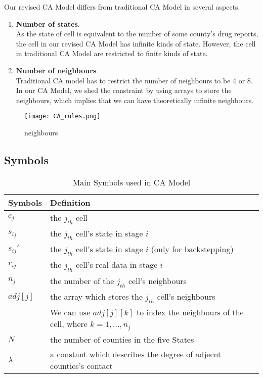 \documentclass{mcmthesis}
\begin{document}
Our revised CA Model differs from traditional CA Model in several aspects. 
\begin{enumerate}
\item \textbf{Number of  states}.\\
As the state of cell is equivalent to the number of some county's drug reports, the cell in our revised CA Model has infinite kinds of state. However, the cell in traditional CA Model are restricted to finite kinds of state.
\item \textbf{Number of neighbours}\\
Traditional CA model has to restrict the number of neighbours to be 4 or 8. In our CA Model, we shed the constraint by using arrays to store the neighbours, which implies that we can have theoretically infinite neighbours.
\end{enumerate}

\begin{figure}[h]
\small
\centering
\texttt{[image: CA\_rules.png]}
\caption{neighbours} \label{fig:neighbours}
\end{figure}


\subsection{Symbols}


\begin{table}[!h]
\centering
\caption{Main Symbols used in CA Model} %
\begin{tabular}{ll}
\toprule[2.5pt]
\textbf{Symbols}& \textbf{Definition} \\
\midrule[1.5pt]
$c_j$ & the $j_{th}$ cell \\
\midrule
$s_{ij}$& the $j_{th}$ cell's state in stage $i$ \\
\midrule
$s_{ij}'$& the $j_{th}$ cell's state in stage $i$ (only for backstepping)\\
\midrule
$r_{ij}$ & the $j_{th}$ cell's real data in stage $i$ \\
\midrule
$n_{j}$ & the number of the $j_{th}$ cell's neighbours\\
\midrule
$adj[j]$ & the array which stores the $j_{th}$ cell's neighbours \\
 & We can use $adj[j][k]$ to index the neighbours of the cell, where $k = 1,...,n_{j}$\\
\midrule
$N$ & the number of counties in the five States\\
\midrule
$\lambda$ & a constant which describes the degree of adjecnt counties's contact \\
\bottomrule
\end{tabular}
\end{table}
\end{document}
